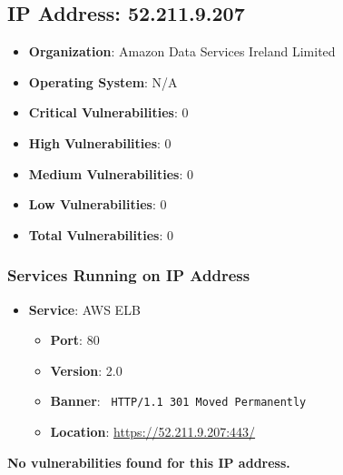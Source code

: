 \documentclass{article}
\begin{document}
\begin{itemize}
\end{itemize}




\clearpage



\subsection*{IP Address: 52.211.9.207}

\begin{itemize}
    \item \textbf{Organization}: Amazon Data Services Ireland Limited
    \item \textbf{Operating System}:  N/A 
    \item \textbf{Critical Vulnerabilities}: 0
    \item \textbf{High Vulnerabilities}: 0
    \item \textbf{Medium Vulnerabilities}: 0
    \item \textbf{Low Vulnerabilities}: 0
    \item \textbf{Total Vulnerabilities}: 0
\end{itemize}

\subsubsection*{Services Running on IP Address}

\begin{itemize}
    
        \item \textbf{Service}: AWS ELB
        \begin{itemize}
            \item \textbf{Port}: 80
            \item \textbf{Version}:  2.0 
            \item \textbf{Banner}: \texttt{
                HTTP/1.1 301 Moved Permanently
            }
            \item \textbf{Location}: \href{ https://52.211.9.207:443/ }{ https://52.211.9.207:443/ }
        \end{itemize}
    
\end{itemize}


\textbf{No vulnerabilities found for this IP address.}




\clearpage
\end{document}

